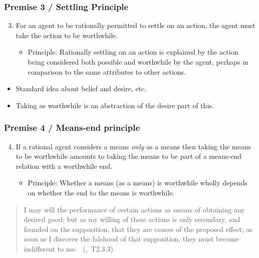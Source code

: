 \documentclass[noamssymb, compress, handout]{beamer} %
\newcommand{\hozlinedash}[0]{%
  \noindent\hdashrule[0.5ex][c]{\textwidth}{.1pt}{2.5pt}
}
\begin{document}
\begin{frame}
  \frametitle{Premise 3 / Settling Principle}

  \begin{enumerate}
    \setcounter{enumi}{2}
  \item For an agent to be rationally permitted to settle on an action, the agent must take the action to be worthwhile.
    \begin{itemize}
    \item Principle: Rationally settling on an action is explained by the action being considered both possible and worthwhile by the agent, perhaps in comparison to the same attributes to other actions.
    \end{itemize}
  \end{enumerate}

  \begin{itemize}
  \item Standard idea about belief and desire, etc.
  \item Taking as worthwhile is an abstraction of the desire part of this.
  \end{itemize}
\end{frame}

\begin{frame}
  \frametitle{Premise 4 / Means-end principle}

  \begin{enumerate}
    \setcounter{enumi}{3}
  \item If a rational agent considers a means \emph{only} as a means then taking the means to be worthwhile amounts to taking the means to be part of a means-end relation with a worthwhile end.
    \begin{itemize}
    \item Principle: Whether a means (as a means) is worthwhile wholly depends on whether the end to the means is worthwhile.
    \end{itemize}
  \end{enumerate}

\end{frame}



\begin{frame}



\begin{quote}
  I may will the performance of certain actions as means of obtaining any desired good; but as my willing of these actions is only secondary, and founded on the supposition, that they are causes of the proposed effect; as soon as I discover the falshood of that supposition, they must become indifferent to me.\nolinebreak
  \mbox{ }\hfill\mbox{\hfill(\citeauthor{Hume:2011aa}, T2.3.3)}
\end{quote}

\end{frame}
\end{document}
